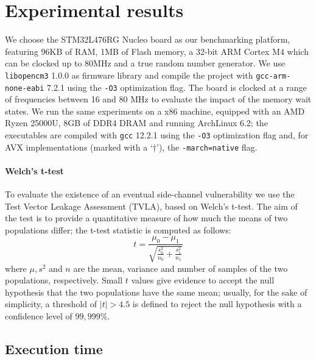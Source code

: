 \documentclass[11pt,a4paper,twocolumn]{article}
\theoremstyle{definition}
\begin{document}
\section{Experimental results}
\label{sec:expres}
We choose the STM32L476RG Nucleo board as our benchmarking platform, featuring 96KB of RAM, 1MB of Flash memory,
a 32-bit ARM Cortex M4 which can be clocked up to 80MHz and a true random number generator.
We use \texttt{libopencm3} 1.0.0 as firmware library and compile the project with \texttt{gcc-arm-none-eabi} 7.2.1
using the \texttt{-O3} optimization flag. The board is clocked at a range of frequencies between 16 and 80 MHz to
evaluate the impact of the memory wait states.
We run the same experiments on a x86 machine, equipped with an AMD Ryzen 25000U, 8GB of DDR4 DRAM and running ArchLinux 6.2; the executables are compiled with
\texttt{gcc} 12.2.1 using the \texttt{-O3} optimization flag and, for AVX implementations (marked with a `$\dagger$'), the \texttt{-march=native} flag. 

\paragraph{Welch's t-test}
To evaluate the existence of an eventual side-channel vulnerability we use the Test Vector Leakage Assessment (TVLA),
based on Welch's t-test. The aim of the test is to provide a quantitative measure of how much the means of two
populations differ; the t-test statistic is computed as follows:
\vspace{-10pt}
\begin{equation}
    t = \frac{\mu_0 - \mu_1}{\sqrt{\frac{s_0^2}{n_0} + \frac{s_1^2}{n_1}}}
\end{equation}  
\vspace{-2pt}
where $\mu, s^2$ and $n$ are the mean, variance and number of samples of the two populations, respectively.
Small $t$ values give evidence to accept the null hypothesis that the two populations have the same mean; 
usually, for the sake of simplicity, a threshold of $|t| > 4.5$ is defined to reject the null hypothesis with
a confidence level of $99,999\%$.


\subsection{Execution time}

\end{document}
